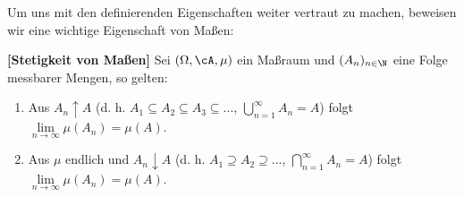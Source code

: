 Um uns mit den definierenden Eigenschaften weiter vertraut zu machen, beweisen wir eine wichtige Eigenschaft von Ma\ss en:




\marginpar{\textcolor{red}{Vorlesung 2}}

\begin{satz}\label{S1}  \textbf{[Stetigkeit von Maßen]}
	Sei $(\Omega, \cA, \mu)$ ein Maßraum und $(A_n)_{n\in \N}$ eine Folge messbarer Mengen, so gelten:
	\begin{enumerate}[label=(\roman*)]
		\item Aus $A_n \uparrow A$ (d. h. $A_1 \subseteq A_2 \subseteq A_3\subseteq ...$, $\bigcup_{n=1}^{\infty} A_n = A$) folgt $\lim\limits_{n \to \infty} \mu (A_n)= \mu (A)$.
		\item Aus $\mu$ endlich und $A_n \downarrow A$ (d. h. $A_1 \supseteq A_2 \supseteq ...$, $\bigcap\limits_{n=1}^{\infty}A_n=A$) folgt $\lim\limits_{n \to \infty}\mu (A_n)=\mu(A)$.
	\end{enumerate}
\end{satz}

